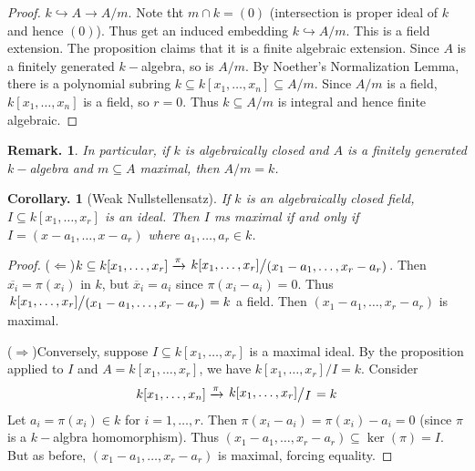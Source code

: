 \documentclass[11pt, a4paper]{memoir}
\newcommand{\impr}{{($\Rightarrow$)\hspace{0.2cm}}}
\newcommand{\impl}{{($\Leftarrow$)\hspace{0.2cm}}}
\newcommand{\fto}[1]{\ensuremath{\xrightarrow{\scriptstyle{#1}}}}
\newcommand{\hto}[0]{\ensuremath{\hookrightarrow}}
\theoremstyle{change}
\newtheorem{corollary}[theorem]{Corollary.}
\theoremstyle{plain}
\theoremstyle{nonumberplain}
\newtheorem{remark}{Remark.}
\newtheorem{proof}{Proof}
\newcommand{\quot}[2]{\mathchoice{\left.\raisebox{0.12em}{$#1$}\middle/\raisebox{-0.12em}{$#2$}\right.}
                                 {\left.\raisebox{0.06em}{$#1$}\middle/\raisebox{-0.06em}{$#2$}\right.}
                                 {\left.\raisebox{0.02em}{$#1$}\middle/\raisebox{-0.02em}{$#2$}\right.}
                                 {\left.\raisebox{0em}{$#1$}\middle/\raisebox{0em}{$#2$}\right.}}
\numberwithin{equation}{section}
\begin{document}
\begin{proof}
    $k\hto A\to A/m$.
    Note tht $m\cap k = (0)$ (intersection is proper ideal of $k$ and hence $(0)$).
    Thus get an induced embedding $k\hookrightarrow A/m$.
    This is a field extension.
    The proposition claims that it is a finite algebraic extension.
    Since $A$ is a finitely generated $k-$algebra, so is $A/m$.
    By Noether's Normalization Lemma, there is a polynomial subring $k\subseteq k[x_1,\ldots,x_n]\subseteq A/m$.
    Since $A/m$ is a field, $k[x_1,\ldots,x_n]$ is a field, so $r=0$.
    Thus $k\subseteq A/m$ is integral and hence finite algebraic.
\end{proof}
\begin{remark}
    In particular, if $k$ is algebraically closed and $A$ is a finitely generated $k-$algebra and $m\subseteq A$ maximal, then $A/m=k$.
\end{remark}
\begin{corollary}[Weak Nullstellensatz]
    If $k$ is an algebraically closed field, $I\subseteq k[x_1,\ldots,x_r]$ is an ideal.
    Then $I$ ms maximal if and only if $I=(x-a_1,\ldots,x-a_r)$ where $a_1,\ldots,a_r\in k$.
\end{corollary}
\begin{proof}
    \impl $k\subseteq k[x_1,\ldots,x_r]\fto{\pi}\quot{k[x_1,\ldots,x_r]}{(x_1-a_1,\ldots,x_r-a_r)}$.
    Then $\overline{x_i}=\pi(x_i)$ in $k$, but $\overline{x}_i=a_i$ since $\pi(x_i-a_i)=0$.
    Thus $\quot{k[x_1,\ldots,x_r]}{(x_1-a_1,\ldots,x_r-a_r)}=k$ a field.
    Then $(x_1-a_1,\ldots,x_r-a_r)$ is maximal.

    \impr Conversely, suppose $I\subseteq k[x_1,\ldots,x_r]$ is a maximal ideal.
    By the proposition applied to $I$ and $A=k[x_1,\ldots,x_r]$, we have $k[x_1,\dots,x_r]/I=k$.
    Consider
    \begin{equation*}
        k[x_1,\ldots,x_n]\fto{\pi}\quot{k[x_1,\ldots,x_r]}{I}=k
    \end{equation*}
    Let $a_i=\pi(x_i)\in k$ for $i=1,\ldots,r$.
    Then $\pi(x_i-a_i)=\pi(x_i)-a_i=0$ (since $\pi$ is a $k-$algbra homomorphism).
    Thus $(x_1-a_1,\ldots,x_r-a_r)\subseteq\ker(\pi)=I$.
    But as before, $(x_1-a_1,\ldots,x_r-a_r)$ is maximal, forcing equality.
\end{proof}
\end{document}
